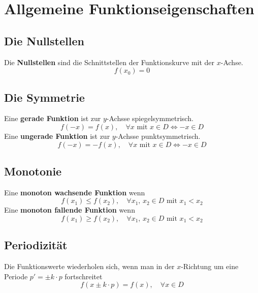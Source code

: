 \section{Allgemeine Funktionseigenschaften}
\subsection{Die Nullstellen}
Die \textbf{Nullstellen} sind die Schnittstellen der Funktionskurve mit der $x$-Achse.
\begin{equation}  
\boxed{f\left(x_0\right)=0}
\end{equation}  
\subsection{Die Symmetrie}
Eine \textbf{gerade Funktion} ist zur $y$-Achsse spiegelsymmetrisch.
\begin{equation}
\boxed{f\left(-x\right)=f\left(x\right),\quad \forall x\text{ mit }x\in D \Leftrightarrow -x\in D}
\end{equation}
Eine \textbf{ungerade Funktion} ist zur $y$-Achsse punktsymmetrisch.
\begin{equation}
\boxed{f\left(-x\right)=-f\left(x\right),\quad \forall x\text{ mit }x\in D \Leftrightarrow -x\in D}
\end{equation}
\subsection{Monotonie}
Eine \textbf{monoton wachsende Funktion} wenn  
\begin{equation}
\boxed{f\left(x_1\right)\leq f\left(x_2\right),\quad \forall x_1,\,x_2\in D\text{ mit } x_1<x_2}
\end{equation}
Eine \textbf{monoton fallende Funktion} wenn  
\begin{equation}
\boxed{f\left(x_1\right)\geq f\left(x_2\right),\quad \forall x_1,\,x_2\in D\text{ mit } x_1<x_2}
\end{equation}
\subsection{Periodizität}
Die Funktionswerte wiederholen sich, wenn man in der $x$-Richtung um eine Periode $p'=\pm k\cdot p$ fortschreitet
\begin{equation}
\boxed{f\left(x\pm k\cdot p\right)=f\left(x\right),\quad \forall x\in D}
\end{equation}
